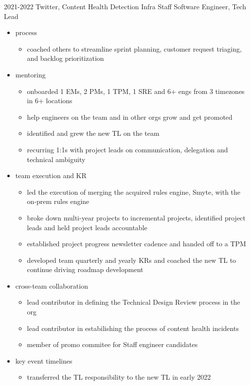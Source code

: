 \documentclass[]{friggeri-cv-a4}
\begin{document}
\begin{entrylist}
  \entry
      {2021-2022}
      {Twitter, Content Health Detection Infra}
      {Staff Software Engineer, Tech Lead}
      {
        \begin{itemize}
        \item process
          \begin{itemize}
          \item coached others to streamline sprint planning, customer request triaging, and backlog prioritization
          \end{itemize}
        \item mentoring
          \begin{itemize}
          \item onboarded 1 EMs, 2 PMs, 1 TPM, 1 SRE and 6+ engs from 3 timezones in 6+ locations
          \item help engineers on the team and in other orgs grow and get promoted
          \item identified and grew the new TL on the team
          \item recurring 1:1s with project leads on communication, delegation and technical ambiguity
          \end{itemize}
        \item team execution and KR
          \begin{itemize}
          \item led the execution of merging the acquired rules engine, Smyte, with the on-prem rules engine
          \item broke down multi-year projects to incremental projects, identified project leads and held project leads accountable
          \item established project progress newsletter cadence and handed off to a TPM
          \item developed team quarterly and yearly KRs and coached the new TL to continue driving roadmap development
          \end{itemize}
        \item cross-team collaboration
          \begin{itemize}
          \item lead contributor in defining the Technical Design Review process in the org
          \item lead contributor in estabilishing the process of content health incidents
          \item member of promo commitee for Staff engineer candidates
          \end{itemize}
        \item key event timelines
          \begin{itemize}
          \item transferred the TL responsibility to the new TL in early 2022
          \end{itemize}
        \end{itemize}
      }
\end{entrylist}
\end{document}
